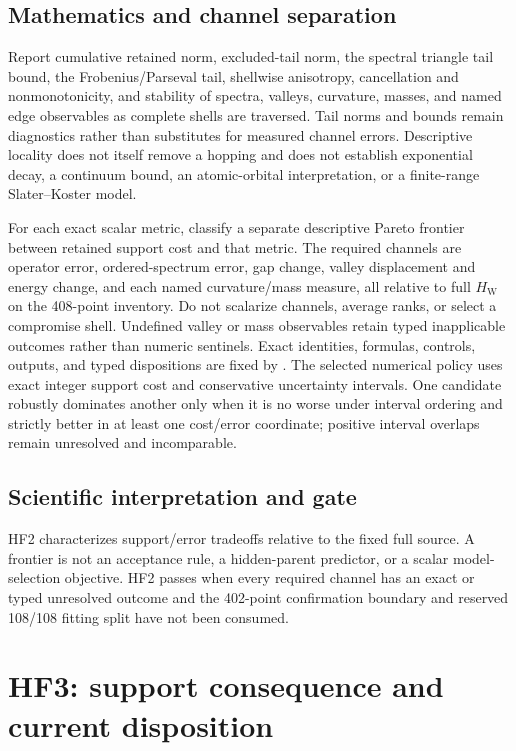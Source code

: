 \documentclass[11pt]{report}
\begin{document}
\section{Mathematics and channel separation}

Report cumulative retained norm, excluded-tail norm, the spectral triangle tail bound,
the Frobenius/Parseval tail, shellwise anisotropy, cancellation and nonmonotonicity, and
stability of spectra, valleys, curvature, masses, and named edge observables as complete
shells are traversed.  Tail norms and bounds remain diagnostics rather than substitutes
for measured channel errors.  Descriptive locality does not itself remove a hopping and
does not establish exponential decay, a continuum bound, an atomic-orbital
interpretation, or a finite-range Slater--Koster model.

For each exact scalar metric, classify a separate descriptive Pareto frontier between
retained support cost and that metric.  The required channels are operator error,
ordered-spectrum error, gap change, valley displacement and energy change, and each
named curvature/mass measure, all relative to full $H_{\mathrm{W}}$ on the 408-point
inventory.  Do not scalarize channels, average ranks, or select a compromise shell.
Undefined valley or mass observables retain typed inapplicable outcomes rather than
numeric sentinels.  Exact identities, formulas, controls, outputs, and typed dispositions
are fixed by
.
The selected numerical policy uses exact integer support cost and conservative
uncertainty intervals.  One candidate robustly dominates another only when it is no
worse under interval ordering and strictly better in at least one cost/error coordinate;
positive interval overlaps remain unresolved and incomparable.

\section{Scientific interpretation and gate}

HF2 characterizes support/error tradeoffs relative to the fixed full source.  A frontier
is not an acceptance rule, a hidden-parent predictor, or a scalar model-selection
objective.  HF2 passes when every required channel has an exact or typed unresolved
outcome and the 402-point confirmation boundary and reserved 108/108 fitting split have
not been consumed.

\chapter{HF3: support consequence and current disposition}
\end{document}
